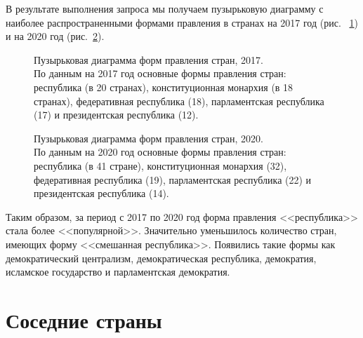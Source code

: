 
В результате выполнения запроса мы получаем пузырьковую диаграмму с наиболее распространенными формами правления в странах на 2017 год (рис. ~\ref{fig:bubble_chart_forms_of_government_countries_2017}) и на 2020 год (рис.~\ref{fig:bubble_chart_forms_of_government_countries_2020}).

\begin{figure}
	{
		\setlength{\fboxsep}{0pt}%
		\setlength{\fboxrule}{1pt}%
	}
	\caption{Пузырьковая диаграмма форм правления стран, 2017.
		\\			
		По данным на 2017 год основные формы правления стран: республика (в 20 странах), конституционная монархия (в 18 странах), федеративная республика (18), парламентская республика (17) и президентская республика (12).}%
	\label{fig:bubble_chart_forms_of_government_countries_2017}%
\end{figure}

\begin{figure}
	{
		\setlength{\fboxsep}{0pt}%
		\setlength{\fboxrule}{1pt}%
	}
	\caption{Пузырьковая диаграмма форм правления стран, 2020.
	\\
	По данным на 2020 год  основные формы правления стран: республика (в 41 стране), конституционная монархия (32), федеративная республика (19), парламентская республика (22) и президентская республика (14).
}%
	\label{fig:bubble_chart_forms_of_government_countries_2020}%
\end{figure}

Таким образом, за период с 2017 по 2020 год форма правления <<республика>> стала более <<популярной>>. Значительно уменьшилось количество стран, имеющих форму  <<смешанная республика>>. Появились такие формы как демократический централизм, демократическая республика, демократия, исламское государство и парламентская демократия.

\section{Соседние страны}

